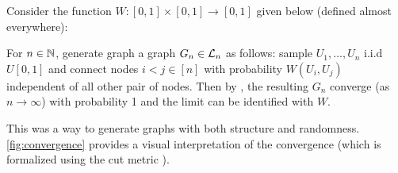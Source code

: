 \documentclass{article}
\begin{document}
\newcommand{\p}{0.5}
\begin{example}
  \label{ex:convergence}
  Consider the function $W: [0,1] \times [0,1] \to [0,1]$ given below (defined almost everywhere):


  For $n \in \N$, generate graph a graph $G_n \in \Lg_{n}$ as follows: sample $U_1,\dots,U_n$ i.i.d $U[0,1]$ and connect nodes $i < j \in [n]$ with probability $W(U_i, U_j)$ independent of all other pair of nodes. Then by \cite[p.~185]{lovasz-book}, the resulting $G_n$ converge (as $n \to \infty$) with probability 1 and the limit can be identified with $W$. 

  This was a way to generate graphs with both structure and randomness. \autoref{fig:convergence} provides a visual interpretation of the convergence (which is formalized using the cut metric \cite[p.~127]{lovasz-book}).
\end{example}
\end{document}
